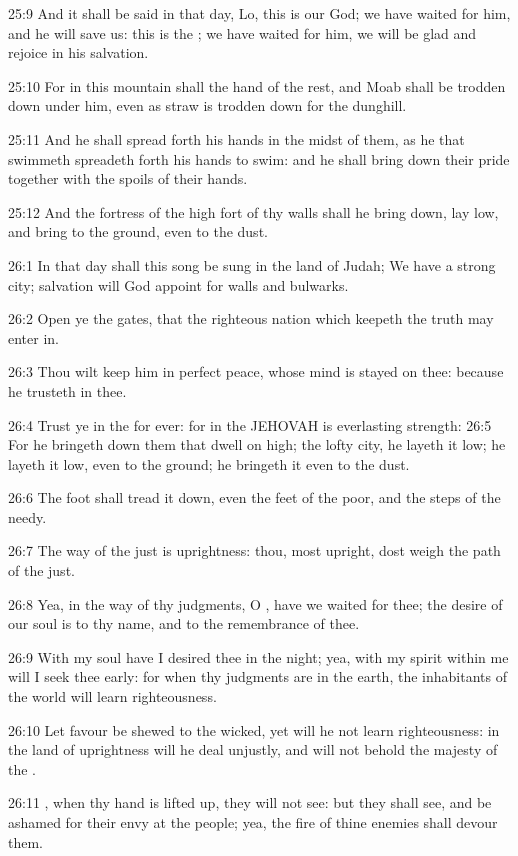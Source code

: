 25:9 And it shall be said in that day, Lo, this is our God; we have waited for him, and he will save us: this is the \LORD; we have waited for him, we will be glad and rejoice in his salvation.

25:10 For in this mountain shall the hand of the \LORD rest, and Moab shall be trodden down under him, even as straw is trodden down for the dunghill.

25:11 And he shall spread forth his hands in the midst of them, as he that swimmeth spreadeth forth his hands to swim: and he shall bring down their pride together with the spoils of their hands.

25:12 And the fortress of the high fort of thy walls shall he bring down, lay low, and bring to the ground, even to the dust.

26:1 In that day shall this song be sung in the land of Judah; We have a strong city; salvation will God appoint for walls and bulwarks.

26:2 Open ye the gates, that the righteous nation which keepeth the truth may enter in.

26:3 Thou wilt keep him in perfect peace, whose mind is stayed on thee: because he trusteth in thee.

26:4 Trust ye in the \LORD for ever: for in the \LORD JEHOVAH is everlasting strength: 26:5 For he bringeth down them that dwell on high; the lofty city, he layeth it low; he layeth it low, even to the ground; he bringeth it even to the dust.

26:6 The foot shall tread it down, even the feet of the poor, and the steps of the needy.

26:7 The way of the just is uprightness: thou, most upright, dost weigh the path of the just.

26:8 Yea, in the way of thy judgments, O \LORD, have we waited for thee; the desire of our soul is to thy name, and to the remembrance of thee.

26:9 With my soul have I desired thee in the night; yea, with my spirit within me will I seek thee early: for when thy judgments are in the earth, the inhabitants of the world will learn righteousness.

26:10 Let favour be shewed to the wicked, yet will he not learn righteousness: in the land of uprightness will he deal unjustly, and will not behold the majesty of the \LORD.

26:11 \LORD, when thy hand is lifted up, they will not see: but they shall see, and be ashamed for their envy at the people; yea, the fire of thine enemies shall devour them.

